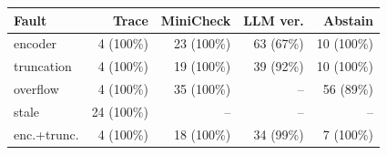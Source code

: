 \begin{tabular}{lrrrr}
\toprule
Fault & Trace & MiniCheck & LLM ver. & Abstain \\
\midrule
encoder & 4 (100\%) & 23 (100\%) & 63 (67\%) & 10 (100\%) \\
truncation & 4 (100\%) & 19 (100\%) & 39 (92\%) & 10 (100\%) \\
overflow & 4 (100\%) & 35 (100\%) & -- & 56 (89\%) \\
stale & 24 (100\%) & -- & -- & -- \\
enc.+trunc. & 4 (100\%) & 18 (100\%) & 34 (99\%) & 7 (100\%) \\
\bottomrule
\end{tabular}
